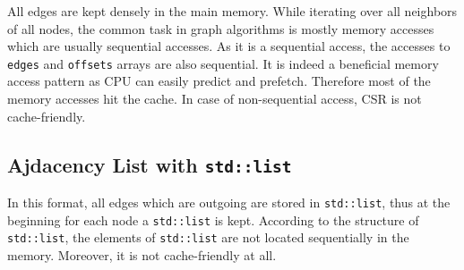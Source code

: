 \documentclass{article}
\begin{document}
All edges are kept densely in the main memory. While iterating over all neighbors of all nodes, the common task in graph algorithms is mostly memory accesses which are usually sequential accesses. As it is a sequential access, the accesses to \texttt{edges} and \texttt{offsets} arrays are also sequential. It is indeed a beneficial memory access pattern as CPU can easily predict and prefetch. Therefore most of the memory accesses hit the cache. In case of non-sequential access, CSR is not cache-friendly.

\subsection{Ajdacency List with \texttt{std::list}}
In this format, all edges which are outgoing are stored in \texttt{std::list}, thus at the beginning for each node a \texttt{std::list} is kept. According to the structure of \texttt{std::list}, the elements of \texttt{std::list} are not located sequentially in the memory. Moreover, it is not cache-friendly at all. \\
\end{document}
